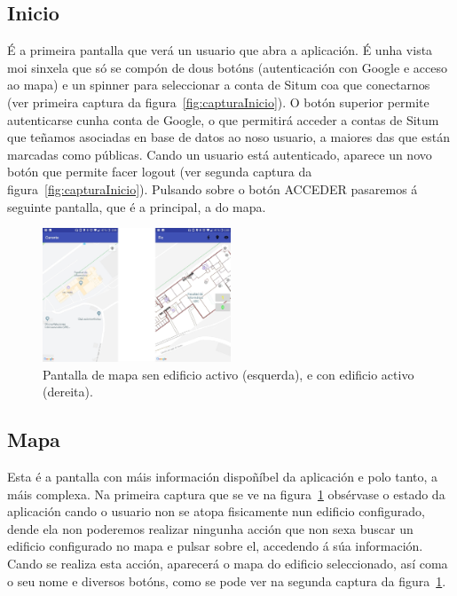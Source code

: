 \subsection{Inicio}
É a primeira pantalla que verá un usuario que abra a aplicación. É unha vista moi sinxela que só se compón de dous botóns (autenticación con Google e acceso ao mapa) e un spinner para seleccionar a conta de Situm coa que conectarnos (ver primeira captura da figura~\ref{fig:capturaInicio}). O botón superior permite autenticarse cunha conta de Google, o que permitirá acceder a contas de Situm que teñamos asociadas en base de datos ao noso usuario, a maiores das que están marcadas como públicas. Cando un usuario está autenticado, aparece un novo botón que permite facer logout (ver segunda captura da figura~\ref{fig:capturaInicio}). Pulsando sobre o botón ACCEDER pasaremos á seguinte pantalla, que é a principal, a do mapa.

\begin{figure}[h]
	\begin{center}
		\includegraphics[width=0.5\textwidth]{figures/android/mapaEdificio}
		\caption{Pantalla de mapa sen edificio activo (esquerda), e con edificio activo (dereita).}
		\label{fig:mapaEdificio}
	\end{center}
\end{figure}


\subsection{Mapa}
Esta é a pantalla con máis información dispoñíbel da aplicación e polo tanto, a máis complexa. Na primeira captura que se ve na figura~\ref{fig:mapaEdificio} obsérvase o estado da aplicación cando o usuario non se atopa fisicamente nun edificio configurado, dende ela non poderemos realizar ningunha acción que non sexa buscar un edificio configurado no mapa e pulsar sobre el, accedendo á súa información. Cando se realiza esta acción, aparecerá o mapa do edificio seleccionado, así coma o seu nome e diversos botóns, como se pode ver na segunda captura da figura~\ref{fig:mapaEdificio}.

